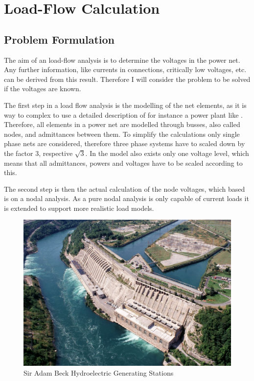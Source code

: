 \chapter{Load-Flow Calculation}

\section{Problem Formulation}
The aim of an load-flow analysis is to determine the voltages in the power net. Any further information, like currents in connections, critically low voltages, etc. can be derived from this result. Therefore I will consider the problem to be solved if the voltages are known.

The first step in a load flow analysis is the modelling of the net elements, as it is way to complex to use a detailed description of for instance a power plant like . Therefore, all elements in a power net are modelled through busses, also called nodes, and admittances between them. To simplify the calculations only single phase nets are considered, therefore three phase systems have to scaled down by the factor 3, respective $\sqrt{3}$. In the model also exists only one voltage level, which means that all admittances, powers and voltages have to be scaled according to this.

The second step is then the actual calculation of the node voltages, which based is on a nodal analysis. As a pure nodal analysis is only capable of current loads it is extended to support more realistic load models.

\begin{figure}
	\includegraphics[width=\textwidth]{figures/adam_beck_complex.jpg}
	\caption{Sir Adam Beck Hydroelectric Generating Stations \citep{adam_back_complex}}
	\label{fig:power_plant}
\end{figure}

